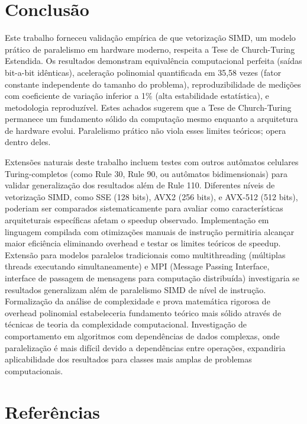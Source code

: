 \documentclass[12pt]{article}
\begin{document}
\section{Conclusão}

Este trabalho forneceu validação empírica de que vetorização SIMD, um modelo prático de paralelismo em hardware moderno, respeita a Tese de Church-Turing Estendida. Os resultados demonstram equivalência computacional perfeita (saídas bit-a-bit idênticas), aceleração polinomial quantificada em 35,58 vezes (fator constante independente do tamanho do problema), reproduzibilidade de medições com coeficiente de variação inferior a 1\% (alta estabilidade estatística), e metodologia reproduzível. Estes achados sugerem que a Tese de Church-Turing permanece um fundamento sólido da computação mesmo enquanto a arquitetura de hardware evolui. Paralelismo prático não viola esses limites teóricos; opera dentro deles.

Extensões naturais deste trabalho incluem testes com outros autômatos celulares Turing-completos (como Rule 30, Rule 90, ou autômatos bidimensionais) para validar generalização dos resultados além de Rule 110. Diferentes níveis de vetorização SIMD, como SSE (128 bits), AVX2 (256 bits), e AVX-512 (512 bits), poderiam ser comparados sistematicamente para avaliar como características arquiteturais específicas afetam o speedup observado. Implementação em linguagem compilada com otimizações manuais de instrução permitiria alcançar maior eficiência eliminando overhead e testar os limites teóricos de speedup. Extensão para modelos paralelos tradicionais como multithreading (múltiplas threads executando simultaneamente) e MPI (Message Passing Interface, interface de passagem de mensagens para computação distribuída) investigaria se resultados generalizam além de paralelismo SIMD de nível de instrução. Formalização da análise de complexidade e prova matemática rigorosa de overhead polinomial estabeleceria fundamento teórico mais sólido através de técnicas de teoria da complexidade computacional. Investigação de comportamento em algoritmos com dependências de dados complexas, onde paralelização é mais difícil devido a dependências entre operações, expandiria aplicabilidade dos resultados para classes mais amplas de problemas computacionais.

\section{Referências}
\end{document}
